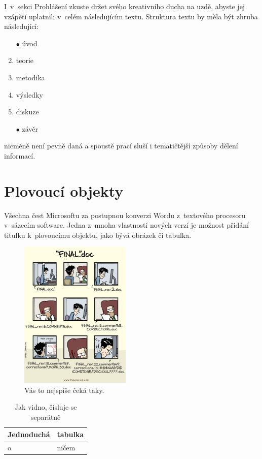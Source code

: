 \documentclass{template/socthesis}
\begin{document}
I~v~sekci Prohlášení zkuste držet svého kreativního ducha na uzdě, abyste jej vzápětí uplatnili v~celém následujícím textu.
Struktura textu by měla být zhruba následující:

\begin{enumerate}
\item[$\bullet$] úvod
\item teorie
\item metodika
\item výsledky
\item diskuze
\item[$\bullet$] závěr
\end{enumerate}
nicméně není pevně daná a spoustě prací sluší i tematičtější způsoby dělení informací.

\section{Plovoucí objekty}
Všechna čest Microsoftu za postupnou konverzi Wordu z~textového procesoru v~sázecím software.
Jedna z~mnoha vlastností nových verzí je možnost přidání titulku k~plovoucímu objektu, jako bývá obrázek či tabulka.

\begin{figure}[h]
  	\centering
 	\includegraphics[width=200px]{img/final_doc.png}
 	\caption{Vás to nejspíše čeká taky.}
\end{figure}

\begin{table}[h]
  \centering
    \begin{tabular}{|l|l|}
    \hline
    Jednoduchá & tabulka \\ \hline
    o~& ničem \\
    \hline
    \end{tabular}
  \caption{Jak vidno, čísluje se separátně}
\end{table}
\end{document}
